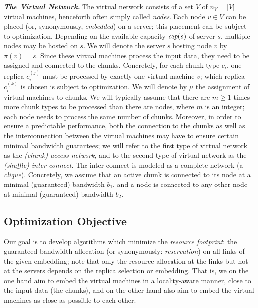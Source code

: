 \documentclass[9pt]{sigcomm-alternate}
\newcommand{\stefan}[1]{\textcolor{blue}{stefan: #1}}
\newcommand{\MaFactor}{m}
\newcommand{\VirtualNodes}{\ensuremath{V}}
\newcommand{\achunk}{\ensuremath{c}}
\newcommand{\capacity}{\emph{cap}}
\newcommand{\CostTrans}{\ensuremath{b_1}}
\newcommand{\CostCom}{\ensuremath{b_2}}
\begin{document}
\textbf{\emph{The Virtual Network.}} The virtual network consists of a set $\VirtualNodes$ of $n_V=|\VirtualNodes|$ virtual machines, 
henceforth often simply called \emph{nodes}.
Each node $v \in \VirtualNodes$ can be placed (or, synonymously, \emph{embedded}) on a server; this placement can be subject
to optimization.
Depending on the available capacity $\capacity(s)$ of server $s$, multiple nodes may be hosted on $s$.
We will denote the server $s$ hosting node $v$ by $\pi(v)=s$.
Since these virtual machines process the input data, they need to be assigned and connected to the
chunks. Concretely, for each chunk type $\achunk_i$, one replica $\achunk_{i}^{(j)}$ must be processed by exactly one virtual machine $v$;
which replica $\achunk_{i}^{(k)}$ is chosen is subject to optimization.
We will denote by $\mu$ the assignment of virtual
machines to chunks.
We will typically assume that there are $\MaFactor\geq 1$ times more chunk types to be processed than there are nodes,
where $\MaFactor$ is an integer;
each node needs to process the same number of chunks.
Moreover, in order to ensure a predictable performance, both the connection to the chunks
as well as the interconnection between the virtual machines may have to ensure certain
minimal bandwidth guarantees; we will refer to the first type of virtual network as the \emph{(chunk) access
network}, and to the second type of virtual network as the \emph{(shuffle) inter-connect}. The inter-connect
is modeled as a complete network (a \emph{clique}). Concretely, we assume that an  active chunk
is connected to its node at a minimal (guaranteed) bandwidth $\CostTrans$, and a node is connected to any other node
at minimal (guaranteed) bandwidth $\CostCom$.



\subsection{Optimization Objective}

Our goal is to develop algorithms which minimize
the \emph{resource footprint}: the guaranteed bandwidth allocation (or synonymously: \emph{reservation}) on all links of the given embedding; note that
only the resource allocation at the links but not at the servers depends on the replica selection or embedding. That is,
we on the one hand aim to embed the virtual machines in a locality-aware manner, close to the input data
(the chunks), and on the other hand also aim to embed the virtual machines as close as possible to
each other. 
\end{document}
